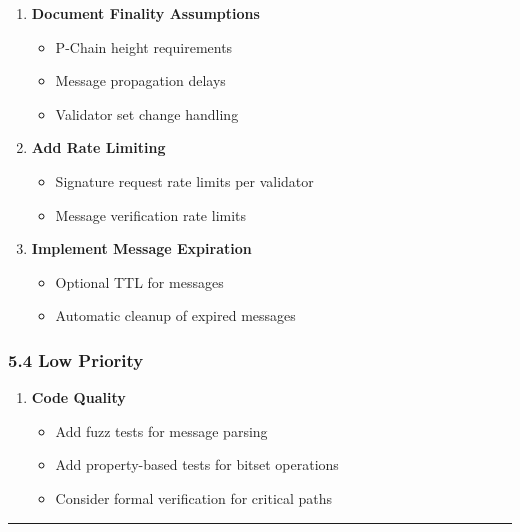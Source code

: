 \documentclass[
]{article}
\providecommand{\tightlist}{%
  \setlength{\itemsep}{0pt}\setlength{\parskip}{0pt}}
\begin{document}
\begin{enumerate}
\def\labelenumi{\arabic{enumi}.}
\setcounter{enumi}{6}
\item
  \textbf{Document Finality Assumptions}

  \begin{itemize}
  \tightlist
  \item
    P-Chain height requirements
  \item
    Message propagation delays
  \item
    Validator set change handling
  \end{itemize}
\item
  \textbf{Add Rate Limiting}

  \begin{itemize}
  \tightlist
  \item
    Signature request rate limits per validator
  \item
    Message verification rate limits
  \end{itemize}
\item
  \textbf{Implement Message Expiration}

  \begin{itemize}
  \tightlist
  \item
    Optional TTL for messages
  \item
    Automatic cleanup of expired messages
  \end{itemize}
\end{enumerate}

\subsubsection{5.4 Low Priority}\label{54-low-priority}

\begin{enumerate}
\def\labelenumi{\arabic{enumi}.}
\setcounter{enumi}{9}
\tightlist
\item
  \textbf{Code Quality}

  \begin{itemize}
  \tightlist
  \item
    Add fuzz tests for message parsing
  \item
    Add property-based tests for bitset operations
  \item
    Consider formal verification for critical paths
  \end{itemize}
\end{enumerate}

\begin{center}\rule{0.5\linewidth}{0.5pt}\end{center}
\end{document}
